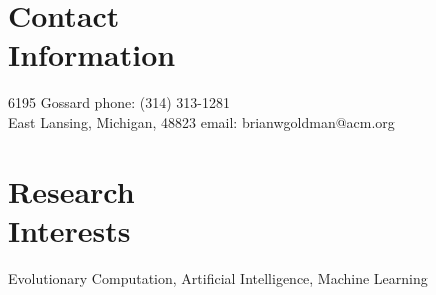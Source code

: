 \documentclass[margin,line]{resume}
\begin{document}
\begin{resume}

    \section{\mysidestyle Contact\\Information}

    6195 Gossard                            \hfill phone: (314) 313-1281          \vspace{0mm}\\\vspace{0mm}%
    East Lansing, Michigan, 48823                          \hfill email: brianwgoldman@acm.org          %
    \section{\mysidestyle Research\\Interests}
    Evolutionary Computation, Artificial Intelligence, Machine Learning


\end{resume}
\end{document}

